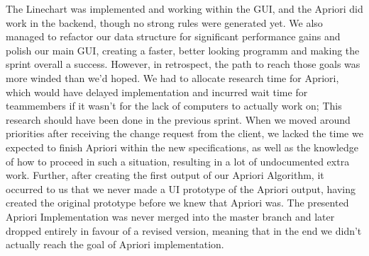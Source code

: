 The Linechart was implemented and working within the GUI, and the Apriori did work in the backend, though no strong rules were generated yet. We also managed to refactor our data structure for significant performance gains and polish our main GUI, creating a faster, better looking programm and making the sprint overall a success. 
However, in retrospect, the path to reach those goals was more winded than we'd hoped. 
We had to allocate research time for Apriori, which would have delayed implementation and incurred wait time for teammembers if it wasn't for the lack of computers to actually work on; This research should have been done in the previous sprint. 
When we moved around priorities after receiving the change request from the client, we lacked the time we expected to finish Apriori within the new specifications, as well as the knowledge of how to proceed in such a situation, resulting in a lot of undocumented extra work. 
Further, after creating the first output of our Apriori Algorithm, it occurred to us that we never made a UI prototype of the Apriori output, having created the original prototype before we knew that Apriori was.
The presented Apriori Implementation was never merged into the master branch and later dropped entirely in favour of a revised version, meaning that in the end we didn't actually reach the goal of Apriori implementation. 